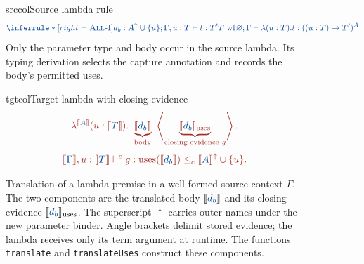 \begin{figure}[!htbp]
\begin{examplepanel}{srccol}{Source lambda rule}
\small
\[
\src{\inferrule*[right=\textsc{All-I}]{
 d_b:A^\uparrow\cup\{u\};\Gamma,u:T\vdash t:T'\\
 T\ \mathrm{wf}
}{\varnothing;\Gamma\vdash\lambda(u:T).t:((u:T)\to T')^A}}
\]
Only the parameter type and body occur in the source lambda. Its typing
derivation selects the capture annotation and records the body's permitted uses.
\end{examplepanel}
\begin{examplepanel}{tgtcol}{Target lambda with closing evidence}
\[
\tgt{
 \lambda^{\tr{A}}(u:\tr{T}).\
       \underbrace{\tr{d_b}}_{\text{body}}\
       \left\langle
       \underbrace{\tr{d_b}_{\mathrm{uses}}}_{\text{closing evidence }g}
       \right\rangle .}
\]
\small
\[
\tgt{
\tr{\Gamma},u:\tr{T}\vdash^c
 g:\uses{\tr{d_b}}\le_c\tr{A}^{\uparrow}\cup\{u\}.}
\]
\end{examplepanel}
\caption{Translation of a lambda premise in a well-formed source context
\(\Gamma\). The two components are the translated body \(\tr{d_b}\)
and its closing evidence \(\tr{d_b}_{\mathrm{uses}}\).
The superscript \(\uparrow\) carries outer names under the new parameter
binder. Angle brackets delimit stored evidence; the lambda receives only
its term argument at runtime. The functions \texttt{translate} and
\texttt{translateUses} construct these components.}
\label{fig:capture-translation}
\end{figure}
